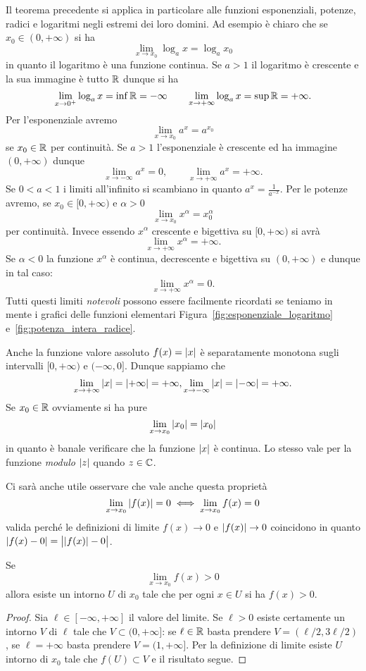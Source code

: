 Il teorema precedente si applica in particolare alle funzioni 
esponenziali, potenze, radici e logaritmi negli estremi dei loro 
domini. Ad esempio è chiaro che se $x_0\in (0,+\infty)$ 
si ha 
\[
  \lim_{x\to x_0} \log_a x = \log_a x_0
\]
in quanto il logaritmo è una funzione continua. 
Se $a>1$ il logaritmo è crescente e la sua immagine è tutto ${\mathbb R}$ 
dunque si ha 
\[
  \lim_{x\to 0^+} \log_a x = \inf {\mathbb R} = -\infty
  \qquad
  \lim_{x\to +\infty} \log_a x = \sup {\mathbb R} = +\infty.
\]
Per l'esponenziale avremo 
\[
 \lim_{x\to x_0} a^x = a^{x_0}
\]
se $x_0\in {\mathbb R}$ per continuità. 
Se $a>1$ l'esponenziale è crescente 
ed ha immagine $(0,+\infty)$ dunque 
\[
  \lim_{x\to -\infty} a^x = 0, \qquad 
  \lim_{x\to +\infty} a^x = +\infty.
\]
Se $0<a<1$ i limiti all'infinito 
si scambiano in quanto $a^{x}= \frac{1}{a^{-x}}$.
Per le potenze avremo, se $x_0\in[0,+\infty)$ e $\alpha>0$
\[
  \lim_{x\to x_0} x^\alpha = x_0^\alpha
\]
per continuità. Invece essendo $x^\alpha$ crescente e bigettiva 
su $[0,+\infty)$ si avrà 
\[
  \lim_{x\to +\infty} x^\alpha = +\infty.
\]
Se $\alpha<0$ la funzione $x^\alpha$ è continua, decrescente e bigettiva 
su $(0,+\infty)$ e dunque in tal caso:
\[
  \lim_{x\to +\infty} x^\alpha = 0.
\]
Tutti questi limiti \emph{notevoli} possono essere facilmente 
ricordati se teniamo in mente i grafici delle funzioni elementari
Figura~\ref{fig:esponenziale_logaritmo} e~\ref{fig:potenza_intera_radice}.

Anche la funzione valore assoluto $f(x)={\left|x\right|}$ è separatamente 
monotona sugli intervalli $[0,+\infty)$ e $(-\infty,0]$. 
Dunque sappiamo che 
\[
  \lim_{x\to +\infty} {\left|x\right|} = {\left|+\infty\right|} = +\infty, 
  \lim_{x\to -\infty} {\left|x\right|} = {\left|-\infty\right|} = +\infty.
\]
Se $x_0\in {\mathbb R}$ ovviamente si ha pure
\[
  \lim_{x\to x_0} {\left|x_0\right|} = {\left|x_0\right|}
\]
in quanto è banale verificare che la funzione ${\left|x\right|}$ è continua.
Lo stesso vale per la funzione \emph{modulo} ${\left|z\right|}$ quando $z\in {\mathbb C}$.

Ci sarà anche utile osservare che vale anche questa proprietà 
\[
\lim_{x\to x_0} {\left|f(x)\right|} = 0 \iff 
\lim_{x\to x_0} f(x) = 0
\]
valida perché le definizioni di limite $f(x)\to 0$ e ${\left|f(x)\right|}\to 0$ 
coincidono in quanto ${\left|f(x)-0\right|} = \big\lvert{{\left|f(x)\right|} - 0}\big\rvert$.

\begin{theorem}%
\mymark{***}%
%
%
%
Se
\[
  \lim_{x\to x_0} f(x) > 0
\]
allora esiste un intorno $U$ di $x_0$ tale che 
per ogni $x\in U$ si ha $f(x) > 0$.
\end{theorem}
%
\begin{proof}
Sia $\ell\in [-\infty,+\infty]$ il valore del limite.
Se $\ell>0$ esiste certamente un intorno $V$ di $\ell$ 
tale che $V\subset (0,+\infty]$: se $\ell\in {\mathbb R}$ basta prendere 
$V=(\ell/2,3 \ell/2)$, se $\ell=+\infty$ basta prendere $V=(1,+\infty]$.
Per la definizione di limite esiste $U$ intorno di $x_0$ 
tale che $f(U)\subset V$ e il risultato segue.
\end{proof}

